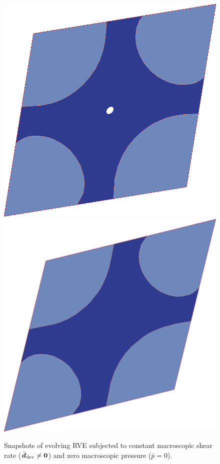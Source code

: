 \documentclass[11pt,a4paper]{article}
\begin{document}
\begin{figure}[thpb!]
  \hspace{1em}
  \includegraphics[scale=0.12]{figures/evolve_c}
  \hspace{1em}
  \includegraphics[scale=0.13]{figures/evolve_d}
  \caption{Snapshots of evolving RVE subjected to constant macroscopic shear rate ($\bar{\boldsymbol{d}}_{\mathrm{dev}} \neq \boldsymbol{0}$) and zero macroscopic pressure ($\bar{p}=0$).}
  \label{fig:evolve_rve}
\end{figure}
\end{document}
